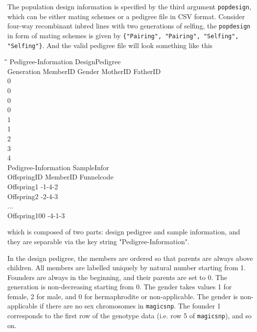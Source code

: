 \documentclass[12pt]{article}
\begin{document}
The population design information is specified by the third argument \verb|popdesign|, which can be either mating schemes or a pedigree file in CSV format. Consider four-way recombinant inbred lines with two generations of selfing, the \verb|popdesign| in form of mating schemes is given by \verb|{"Pairing", "Pairing", "Selfing", "Selfing"}|. And the valid pedigree file will look something like this

\begin{tabbing}
\hspace{4cm}\=\hspace{3cm}\=\hspace{2cm}\=\hspace{2cm}\=\hspace{2cm}\=\kill
Pedigree-Information \> DesignPedigree \\
Generation \>MemberID  \> Gender \> MotherID \>FatherID \\
0        \\
0        \\
0        \\
0        \\
1        \\
1        \\
2        \\
3        \\
4        \\
Pedigree-Information \> SampleInfor \\
OffspringID \>MemberID  \> Funnelcode \\
Offspring1     -1-4-2 \\
Offspring2     -2-4-3 \\
... \\
Offspring100     -4-1-3 
\end{tabbing}
which is composed of two parts:  design pedigree and sample information, and they are separable via the key string "Pedigree-Information". 

In the design pedigree, the members are ordered so that parents are always above children. All members are labelled  uniquely by natural number starting from 1. Founders are always in the beginning, and their parents are set to 0. The generation is non-decreasing starting from 0. The gender takes values 1 for female, 2 for male, and 0 for hermaphrodite or non-applicable. The gender is non-applicable if there are no sex chromosomes in \verb|magicsnp|. The founder 1 corresponds to the first row of the genotype data (i.e. row 5 of \verb|magicsnp|), and so on. 
\end{document}
